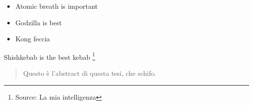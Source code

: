 \begin{itemize}
    \item Atomic breath is important %
    \item Godzilla is best
    \item Kong feccia
\end{itemize}

Shishkebab is the best kebab
\footnote{Source: La mia intelligenza}

\usepackage{lineno} %
\linenumbers


\begin{abstract}
    Questo è l'abstract di questa tesi, che schifo.
\end{abstract}



\documentclass[a4paper, 12pt]{article}
\usepackage{graphicx} %
\usepackage{lineno}
\usepackage{hyperref}
\usepackage{natbib}
\usepackage{color}
\linenumbers
\newcommand{\tb}{\textcolor{blue}}
\linespread{1.5}





\maketitle

$^1$ UNIBO - via Irnerio....

\tableofcontents

\begin{abstract}
The house stood on a slight rise just on the edge of the village. It stood on its own and looked out over a broad spread of West Country farmland. Not a remarkable house by any means—it was about thirty years old, squattish, squarish, made of brick, and had four windows set in the front of a size and proportion which more or less exactly failed to please the eye.
\end{abstract}

